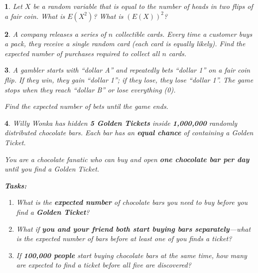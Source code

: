\documentclass[%
addpoints]{exam}
\theoremstyle{problem}
\newtheorem{p}{}
\begin{document}
\begin{p}
Let \( X \) be a random variable that is equal to the number of heads in two flips of a  
fair coin. What is \( E(X^2) \)? What is \( (E(X))^2 \)?
\hfill \end{p}

\begin{p}
A company releases a series of $n$ collectible cards. Every time a customer buys a pack, they receive a single random card (each card is equally likely). Find the expected number of purchases required to collect all $n$ cards.
\hfill\end{p}

\begin{p}
A gambler starts with ``dollar A'' and repeatedly bets ``dollar 1'' on a fair coin flip. If they win, they gain ``dollar 1''; if they lose, they lose ``dollar 1''. The game stops when they reach ``dollar B'' or lose everything (0). 

Find the expected number of bets until the game ends.
\hfill\end{p}

\begin{p}
Willy Wonka has hidden \textbf{5 Golden Tickets} inside \textbf{1,000,000} randomly distributed chocolate bars. Each bar has an \textbf{equal chance} of containing a Golden Ticket.

You are a chocolate fanatic who can buy and open \textbf{one chocolate bar per day} until you find a Golden Ticket.

\textbf{Tasks:}
\begin{enumerate}
    \item What is the \textbf{expected number} of chocolate bars you need to buy before you find a \textbf{Golden Ticket}?
    \item What if \textbf{you and your friend both start buying bars separately}—what is the expected number of bars before at least one of you finds a ticket?
    \item If \textbf{100,000 people} start buying chocolate bars at the same time, how many are expected to find a ticket before all five are discovered?
\end{enumerate}
\hfill\end{p}
\end{document}
